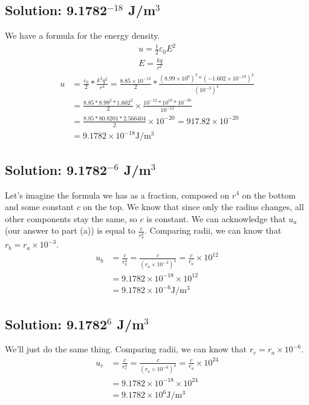 \documentclass[12pt]{article}
\begin{document}
\subsection{Solution: 9.1782$^{-18}$ J/m$^3$}
We have a formula for the energy density.
\begin{gather*}
    u = \frac{1}{2}\varepsilon_0E^2\\
    E   =   \frac{kq}{r^2}
\end{gather*}\begin{align*}
    u   &=  \frac{\varepsilon_0}{2}*\frac{k^2q^2}{r^4}
        =   \frac{8.85 \times 10^{-12}}{2}*\frac{(8.99 \times 10^9)^2*(-1.602 \times 10^{-19})^2}{(10^{-3})^4}\\
        &=  \frac{8.85 * 8.99^2 * 1.602^2}{2} \times \frac{10^{-12} * 10^{18} * 10^{-38}}{10^{-12}}\\
        &=  \frac{8.85*80.8201*2.566404}{2} \times 10^{-20}
        =   917.82 \times 10^{-20}\\
        &=  \boxed{9.1782 \times 10^{-18} \unit{\joule/\meter^3}}
\end{align*}

\subsection{Solution: 9.1782$^{-6}$ J/m$^3$}
Let's imagine the formula we has as a fraction, composed on $r^4$ on the bottom and some constant $c$ on the top. 
We know that since only the radius changes, all other components stay the same, so $c$ is constant.
We can acknowledge that $u_a$ (our answer to part (a)) is equal to $\frac{c}{r_a^4}$.
Comparing radii, we can know that $r_b = r_a \times 10^{-3}$.
\begin{align*}
    u_b &=  \frac{c}{r_b^4}
        =   \frac{c}{(r_a \times 10^{-3})^4}
        =   \frac{c}{r_a} \times 10^{12}\\
        &=  9.1782 \times 10^{-18} \times 10^{12}\\
        &=  \boxed{9.1782 \times 10^{-6} \unit{\joule/\meter^3}}
\end{align*}

\subsection{Solution: 9.1782$^{6}$ J/m$^3$}
We'll just do the same thing. 
Comparing radii, we can know that $r_c = r_a \times 10^{-6}$.
\begin{align*}
    u_c &=  \frac{c}{r_c^4}
        =   \frac{c}{(r_a \times 10^{-6})^4}
        =   \frac{c}{r_a} \times 10^{24}\\
        &=  9.1782 \times 10^{-18} \times 10^{24}\\
        &=  \boxed{9.1782 \times 10^{6} \unit{\joule/\meter^3}}
\end{align*}
\end{document}
